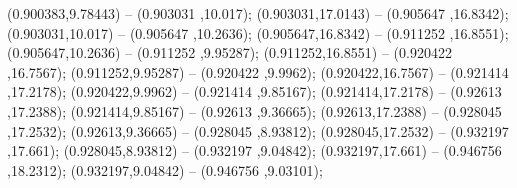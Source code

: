  (0.900383,9.78443) -- (0.903031 ,10.017);
 (0.903031,17.0143) -- (0.905647 ,16.8342);
 (0.903031,10.017) -- (0.905647 ,10.2636);
 (0.905647,16.8342) -- (0.911252 ,16.8551);
 (0.905647,10.2636) -- (0.911252 ,9.95287);
 (0.911252,16.8551) -- (0.920422 ,16.7567);
 (0.911252,9.95287) -- (0.920422 ,9.9962);
 (0.920422,16.7567) -- (0.921414 ,17.2178);
 (0.920422,9.9962) -- (0.921414 ,9.85167);
 (0.921414,17.2178) -- (0.92613 ,17.2388);
 (0.921414,9.85167) -- (0.92613 ,9.36665);
 (0.92613,17.2388) -- (0.928045 ,17.2532);
 (0.92613,9.36665) -- (0.928045 ,8.93812);
 (0.928045,17.2532) -- (0.932197 ,17.661);
 (0.928045,8.93812) -- (0.932197 ,9.04842);
 (0.932197,17.661) -- (0.946756 ,18.2312);
 (0.932197,9.04842) -- (0.946756 ,9.03101);
